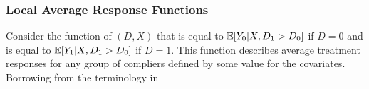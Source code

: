 \subsubsection{Local Average Response Functions}

Consider the function of $(D,X)$ that is equal to $\mathbb{E}[Y_0 | X, D_1 > D_0]$ if $D = 0$ and is equal to $\mathbb{E}[Y_1 | X, D_1 > D_0]$ if $D = 1$. This function describes average treatment responses for any group of compliers defined by some value for the covariates. Borrowing from the terminology in 














